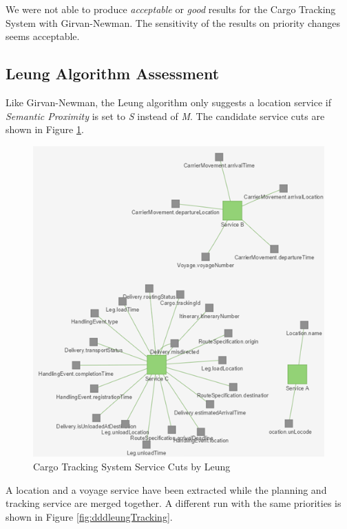 We were not able to produce \textit{acceptable} or \textit{good} results for the Cargo Tracking System with Girvan-Newman. The sensitivity of the results on priority changes seems acceptable. 

\subsection{Leung Algorithm Assessment}

Like Girvan-Newman, the Leung algorithm only suggests a location service if \textit{Semantic Proximity} is set to \textit{S} instead of \textit{M}. The candidate service cuts are shown in Figure \ref{fig:dddleungVoyage}.	

\begin{figure}[H]
	\includegraphics[scale=0.9]{images/leung_voyage.png}
	\caption{Cargo Tracking System Service Cuts by Leung}
	\label{fig:dddleungVoyage}
\end{figure}

A location and a voyage service have been extracted while the planning and tracking service are merged together. A different run with the same priorities is shown in Figure \ref{fig:dddleungTracking}.

